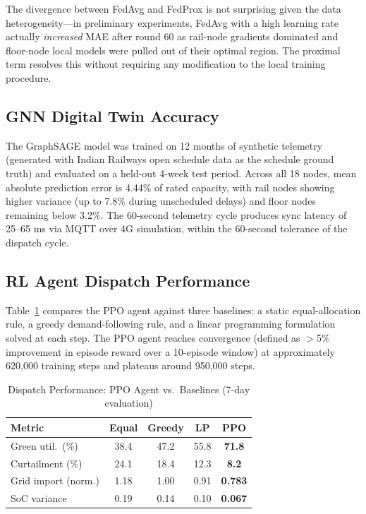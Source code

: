 \documentclass[conference]{IEEEtran}
\begin{document}
The divergence between FedAvg and FedProx is not surprising given the data heterogeneity—in preliminary experiments, FedAvg with a high learning rate actually \textit{increased} MAE after round 60 as rail-node gradients dominated and floor-node local models were pulled out of their optimal region. The proximal term resolves this without requiring any modification to the local training procedure.

\subsection{GNN Digital Twin Accuracy}

The GraphSAGE model was trained on 12 months of synthetic telemetry (generated with Indian Railways open schedule data as the schedule ground truth) and evaluated on a held-out 4-week test period. Across all 18 nodes, mean absolute prediction error is 4.44\% of rated capacity, with rail nodes showing higher variance (up to 7.8\% during unscheduled delays) and floor nodes remaining below 3.2\%. The 60-second telemetry cycle produces sync latency of 25--65 ms via MQTT over 4G simulation, within the 60-second tolerance of the dispatch cycle.

\subsection{RL Agent Dispatch Performance}

Table~\ref{tab:rl} compares the PPO agent against three baselines: a static equal-allocation rule, a greedy demand-following rule, and a linear programming formulation solved at each step. The PPO agent reaches convergence (defined as $>$5\% improvement in episode reward over a 10-episode window) at approximately 620,000 training steps and plateaus around 950,000 steps.

\begin{table}[ht]
\caption{Dispatch Performance: PPO Agent vs.\ Baselines (7-day evaluation)}
\label{tab:rl}
\centering
\begin{tabular}{lcccc}
\toprule
\textbf{Metric} & \textbf{Equal} & \textbf{Greedy} & \textbf{LP} & \textbf{PPO} \\
\midrule
Green util.\ (\%)   & 38.4 & 47.2 & 55.8 & \textbf{71.8} \\
Curtailment (\%)    & 24.1 & 18.4 & 12.3 & \textbf{8.2} \\
Grid import (norm.) & 1.18 & 1.00 & 0.91 & \textbf{0.783} \\
SoC variance        & 0.19 & 0.14 & 0.10 & \textbf{0.067} \\
\bottomrule
\end{tabular}
\end{table}
\end{document}
